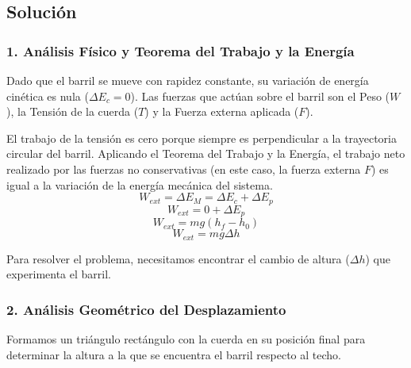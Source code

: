 \documentclass[12pt, a4paper]{article}
\begin{document}
\begin{center}
\end{center}

\subsection*{Solución}

\subsubsection*{1. Análisis Físico y Teorema del Trabajo y la Energía}
Dado que el barril se mueve con rapidez constante, su variación de energía cinética es nula ($\Delta E_c = 0$). Las fuerzas que actúan sobre el barril son el Peso ($W$), la Tensión de la cuerda ($T$) y la Fuerza externa aplicada ($F$). 

El trabajo de la tensión es cero porque siempre es perpendicular a la trayectoria circular del barril. Aplicando el Teorema del Trabajo y la Energía, el trabajo neto realizado por las fuerzas no conservativas (en este caso, la fuerza externa $F$) es igual a la variación de la energía mecánica del sistema.
$$ W_{ext} = \Delta E_M = \Delta E_c + \Delta E_p $$
$$ W_{ext} = 0 + \Delta E_p $$
$$ W_{ext} = mg(h_f - h_0) $$
$$ W_{ext} = mg \Delta h $$

Para resolver el problema, necesitamos encontrar el cambio de altura ($\Delta h$) que experimenta el barril.

\subsubsection*{2. Análisis Geométrico del Desplazamiento}
Formamos un triángulo rectángulo con la cuerda en su posición final para determinar la altura a la que se encuentra el barril respecto al techo.
\end{document}

